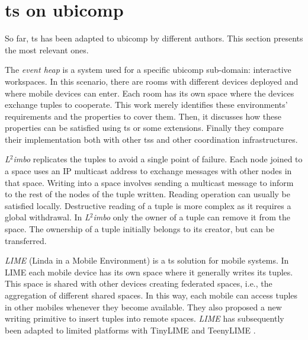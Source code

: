 \section{\acl{ts} on \acs{ubicomp}}
\label{sec:soa_ts_ubicomp}

So far, \acl{ts} has been adapted to \acl{ubicomp} by different authors.
This section presents the most relevant ones. %




The \emph{event heap} \citep{johanson_extending_2004} is a system used for a specific \ac{ubicomp} sub-domain: interactive workspaces.
In this scenario, there are rooms with different devices deployed and where mobile devices can enter.
Each room has its own space where the devices exchange tuples to cooperate.
This work merely identifies these environments' requirements and the properties to cover them. %
Then, it discusses how these properties can be satisfied using \ac{ts} or some extensions.
Finally they compare their implementation both with other \acp{ts} and other coordination infrastructures. %


\emph{L$^2$imbo} \citep{davies_l2imbo:_1998,friday_experiences_1999} replicates the tuples to avoid a single point of failure.
Each node joined to a space uses an IP multicast address to exchange messages with other nodes in that space.
Writing into a space involves sending a multicast message to inform to the rest of the nodes of the tuple written.
Reading operation can usually be satisfied locally.
Destructive reading of a tuple is more complex as it requires a global withdrawal.
In \emph{L$^2$imbo} only the owner of a tuple can remove it from the space.
The ownership of a tuple initially belongs to its creator, but can be transferred. %


\emph{LIME} (Linda in a Mobile Environment) \citep{picco_lime:_1999} is a \ac{ts} solution for mobile systems.
In LIME each mobile device has its own space where it generally writes its tuples.
This space is shared with other devices creating federated spaces, i.e., the aggregation of different shared spaces.
In this way, each mobile can access tuples in other mobiles whenever they become available.
They also proposed a new writing primitive to insert tuples into remote spaces.
\emph{LIME} has subsequently been adapted to limited platforms \citep{murphy_transiently_2006} with TinyLIME \citep{curino_tinylime:_2005} and TeenyLIME \citep{costa_programming_2007}.

